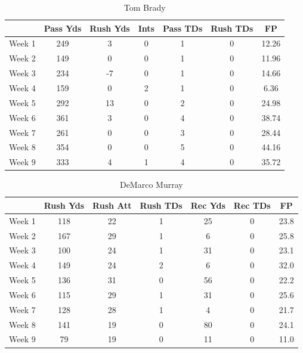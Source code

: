 \documentclass{article}
\begin{document}
    \begin{table}[h,t]
        \caption{ Tom Brady }
        \begin{tabular}{ l|ccccc|c| }
            \hline
 & Pass Yds & Rush Yds & Ints & Pass TDs & Rush TDs & FP\\
            \hline \hline
Week 1 & 249 & 3 & 0 & 1 & 0 & 12.26\\
Week 2 & 149 & 0 & 0 & 1 & 0 & 11.96\\
Week 3 & 234 & -7 & 0 & 1 & 0 & 14.66\\
Week 4 & 159 & 0 & 2 & 1 & 0 & 6.36\\
Week 5 & 292 & 13 & 0 & 2 & 0 & 24.98\\
Week 6 & 361 & 3 & 0 & 4 & 0 & 38.74\\
Week 7 & 261 & 0 & 0 & 3 & 0 & 28.44\\
Week 8 & 354 & 0 & 0 & 5 & 0 & 44.16\\
Week 9 & 333 & 4 & 1 & 4 & 0 & 35.72\\
            \hline
        \end{tabular}
    \end{table}
    \begin{table}[h,t]
        \caption{ DeMarco Murray }
        \begin{tabular}{ l|ccccc|c| }
            \hline
 & Rush Yds & Rush Att & Rush TDs & Rec Yds & Rec TDs & FP\\
            \hline \hline
Week 1 & 118 & 22 & 1 & 25 & 0 & 23.8\\
Week 2 & 167 & 29 & 1 & 6 & 0 & 25.8\\
Week 3 & 100 & 24 & 1 & 31 & 0 & 23.1\\
Week 4 & 149 & 24 & 2 & 6 & 0 & 32.0\\
Week 5 & 136 & 31 & 0 & 56 & 0 & 22.2\\
Week 6 & 115 & 29 & 1 & 31 & 0 & 25.6\\
Week 7 & 128 & 28 & 1 & 4 & 0 & 21.7\\
Week 8 & 141 & 19 & 0 & 80 & 0 & 24.1\\
Week 9 & 79 & 19 & 0 & 11 & 0 & 11.0\\
            \hline
        \end{tabular}
    \end{table}
\end{document}
